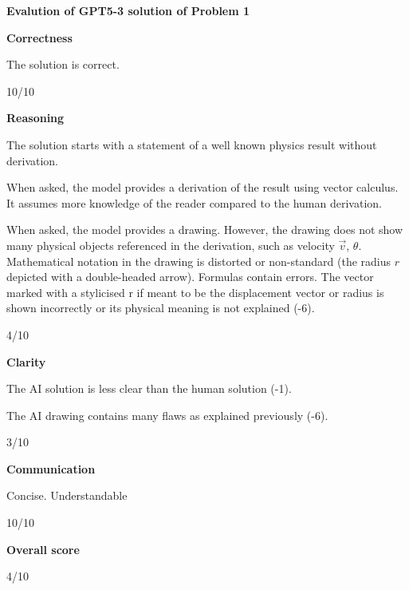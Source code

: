 \documentclass{article}
\begin{document}
{\bf Evalution of GPT5-3 solution of Problem 1}

{\bf Correctness}

The solution is correct.

10/10

{\bf Reasoning}

The solution starts with a statement of a well known physics result without derivation. 

When asked, the model provides a derivation of the result using vector calculus. It assumes more knowledge of the reader compared to the human derivation.

When asked, the model provides a drawing. However, the drawing does not show many physical objects referenced in the derivation, such as velocity $\vec{v}$, $\theta$. Mathematical notation in the drawing is distorted or non-standard (the radius $r$ depicted with a double-headed arrow). Formulas contain errors. The vector marked with a stylicised r if meant to be the displacement vector or radius is shown incorrectly or its physical meaning is not explained (-6).

4/10

{\bf Clarity}

The AI solution is less clear than the human solution (-1).

The AI drawing contains many flaws as explained previously (-6).

3/10

{\bf Communication}

Concise. Understandable

10/10

{\bf Overall score}

4/10
\end{document}
